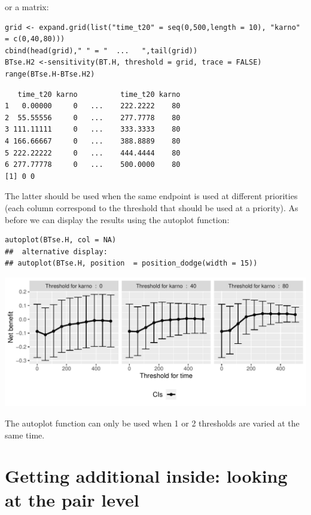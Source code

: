 \documentclass[12pt]{article}
\begin{document}
or a matrix:

\lstset{language=r,label= ,caption= ,captionpos=b,numbers=none}
\begin{lstlisting}
grid <- expand.grid(list("time_t20" = seq(0,500,length = 10), "karno" = c(0,40,80)))
cbind(head(grid)," " = "  ...   ",tail(grid))
BTse.H2 <-sensitivity(BT.H, threshold = grid, trace = FALSE)
range(BTse.H-BTse.H2)
\end{lstlisting}

\begin{verbatim}
   time_t20 karno          time_t20 karno
1   0.00000     0   ...    222.2222    80
2  55.55556     0   ...    277.7778    80
3 111.11111     0   ...    333.3333    80
4 166.66667     0   ...    388.8889    80
5 222.22222     0   ...    444.4444    80
6 277.77778     0   ...    500.0000    80
[1] 0 0
\end{verbatim}


The latter should be used when the same endpoint is used at different
priorities (each column correspond to the threshold that should be
used at a priority). As before we can display the results using the
autoplot function:
\lstset{language=r,label= ,caption= ,captionpos=b,numbers=none}
\begin{lstlisting}
autoplot(BTse.H, col = NA)
##  alternative display:
## autoplot(BTse.H, position  = position_dodge(width = 15))
\end{lstlisting}

\begin{center}
\includegraphics[width=\textwidth]{./figures/gg-sensitivity2.pdf}
\end{center}

The autoplot function can only be used when 1 or 2 thresholds are
varied at the same time.
\clearpage

\section{Getting additional inside: looking at the pair level}
\label{sec:org76ed004}
\end{document}
